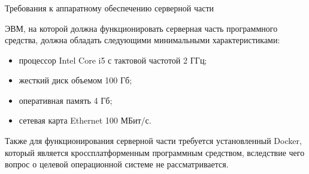 \subsubsection{} Требования к аппаратному обеспечению серверной части
\label{sec:analysis:research:req:server_requirments}

ЭВМ, на которой должна функционировать серверная часть программного средства, должна обладать следующими минимальными характеристиками:

\begin{itemize}
	\item процессор Intel Core i5 с тактовой частотой 2 ГГц;
	\item жесткий диск объемом 100 Гб;
	\item оперативная память 4 Гб;
	\item сетевая карта Ethernet 100 МБит/с.
\end{itemize}

Также для функционирования серверной части требуется установленный Docker, который является кроссплатформенным программным средством, вследствие чего вопрос о целевой операционной системе не рассматривается.